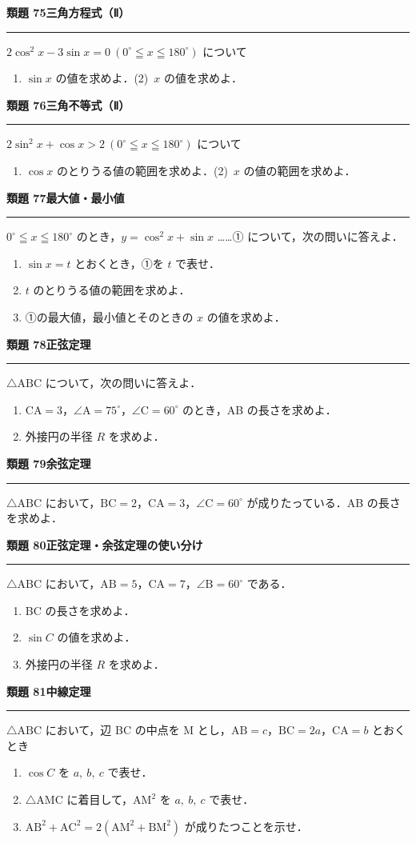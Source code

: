\documentclass[a4paper,11pt]{ltjsarticle}
\newcommand{\mon}[2]{\Needspace{7\baselineskip}\vspace{10pt}%
  {\sffamily\bfseries 類題 #1\quad #2\par}\vspace{2pt}\hrule\vspace{4pt}}
\begin{document}
\mon{75}{三角方程式（Ⅱ）}
$2\cos^2x-3\sin x=0\ (0^\circ\leqq x\leqq180^\circ)$ について
\begin{enumerate}
\item $\sin x$ の値を求めよ．\qquad (2)\ $x$ の値を求めよ．
\end{enumerate}

\mon{76}{三角不等式（Ⅱ）}
$2\sin^2x+\cos x>2\ (0^\circ\leqq x\leqq180^\circ)$ について
\begin{enumerate}
\item $\cos x$ のとりうる値の範囲を求めよ．\qquad (2)\ $x$ の値の範囲を求めよ．
\end{enumerate}

\mon{77}{最大値・最小値}
$0^\circ\leqq x\leqq180^\circ$ のとき，$y=\cos^2x+\sin x$ ……① について，次の問いに答えよ．
\begin{enumerate}
\item $\sin x=t$ とおくとき，①を $t$ で表せ．
\item $t$ のとりうる値の範囲を求めよ．
\item ①の最大値，最小値とそのときの $x$ の値を求めよ．
\end{enumerate}

\mon{78}{正弦定理}
$\triangle\mathrm{ABC}$ について，次の問いに答えよ．
\begin{enumerate}
\item $\mathrm{CA}=3$，$\angle\mathrm A=75^\circ$，$\angle\mathrm C=60^\circ$ のとき，AB の長さを求めよ．
\item 外接円の半径 $R$ を求めよ．
\end{enumerate}

\mon{79}{余弦定理}
$\triangle\mathrm{ABC}$ において，$\mathrm{BC}=2$，$\mathrm{CA}=3$，$\angle\mathrm C=60^\circ$ が成りたっている．AB の長さを求めよ．

\mon{80}{正弦定理・余弦定理の使い分け}
$\triangle\mathrm{ABC}$ において，$\mathrm{AB}=5$，$\mathrm{CA}=7$，$\angle\mathrm B=60^\circ$ である．
\begin{enumerate}
\item BC の長さを求めよ．
\item $\sin C$ の値を求めよ．
\item 外接円の半径 $R$ を求めよ．
\end{enumerate}

\mon{81}{中線定理}
$\triangle\mathrm{ABC}$ において，辺 BC の中点を M とし，$\mathrm{AB}=c$，$\mathrm{BC}=2a$，$\mathrm{CA}=b$ とおくとき
\begin{enumerate}
\item $\cos C$ を $a,\ b,\ c$ で表せ．
\item $\triangle\mathrm{AMC}$ に着目して，$\mathrm{AM}^2$ を $a,\ b,\ c$ で表せ．
\item $\mathrm{AB}^2+\mathrm{AC}^2=2(\mathrm{AM}^2+\mathrm{BM}^2)$ が成りたつことを示せ．
\end{enumerate}
\end{document}
